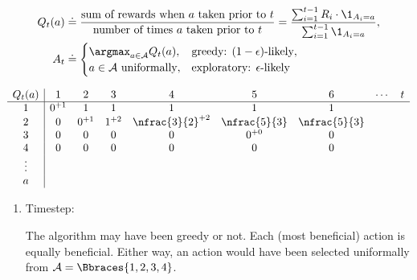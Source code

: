 \begin{solution}

\begin{align*}
    Q_t(a)
    & \doteq
    \frac
    {
        \text{sum of rewards when $a$ taken prior to $t$}
    }{
        \text{number of times $a$ taken prior to $t$}
    }
    =
    \frac
    {
        \sum_{i=1}^{t-1}
            R_i \cdot \1_{A_i = a}
    }{
        \sum_{i=1}^{t-1}
            \1_{A_i = a}
    }, \\
    A_t
    & \doteq
    \begin{cases}
        \argmax_{a \in \mathcal A} Q_t(a),    & \text{greedy: $(1 - \epsilon)$-likely}, \\
        a \in \mathcal A ~\text{uniformally}, & \text{exploratory: $\epsilon$-likely}
    \end{cases}
\end{align*}

\begin{align*}
    \begin{array}{c|cccccccc}
        Q_t(a) & 1      & 2      & 3      & 4                 & 5            & 6            & \cdots & t \\ \hline
        1      & 0^{+1} & 1      & 1      & 1                 & 1            & 1            &        &   \\
        2      & 0      & 0^{+1} & 1^{+2} & \nfrac{3}{2}^{+2} & \nfrac{5}{3} & \nfrac{5}{3} &        &   \\
        3      & 0      & 0      & 0      & 0                 & 0^{+0}       & 0            &        &   \\
        4      & 0      & 0      & 0      & 0                 & 0            & 0            &        &   \\
        \vdots &        &        &        &                   &              &              &        &   \\
        a      &        &        &        &                   &              &              &        &   \\
    \end{array}
\end{align*}

\begin{enumerate}[label = \arabic*.]

    \item Timestep:
    
    The algorithm may have been greedy or not.
    Each (most beneficial) action is equally beneficial.
    Either way, an action would have been selected uniformally from $\mathcal A = \Bbraces{1, 2, 3, 4}$.


\end{enumerate}
\end{solution}
